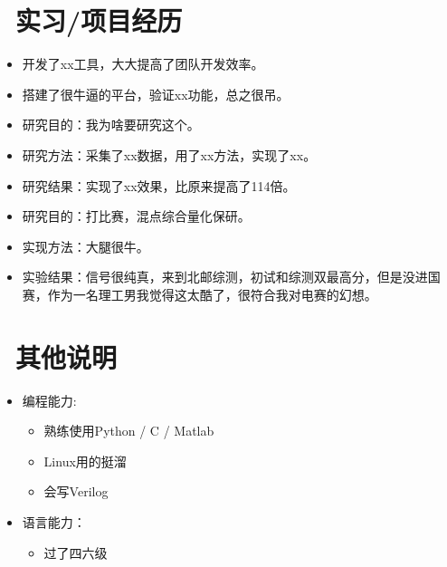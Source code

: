 \documentclass{resume}
\begin{document}
\section{\faUsers\ 实习/项目经历}

\begin{itemize}
  \item 开发了xx工具，大大提高了团队开发效率。
  \item 搭建了很牛逼的平台，验证xx功能，总之很吊。
\end{itemize}

\begin{itemize}
  \item 研究目的：我为啥要研究这个。
  \item 研究方法：采集了xx数据，用了xx方法，实现了xx。
  \item 研究结果：实现了xx效果，比原来提高了114倍。
\end{itemize}

\begin{itemize}
  \item 研究目的：打比赛，混点综合量化保研。
  \item 实现方法：大腿很牛。
  \item 实验结果：信号很纯真，来到北邮综测，初试和综测双最高分，但是没进国赛，作为一名理工男我觉得这太酷了，很符合我对电赛的幻想。
\end{itemize}


\section{\faCogs\ 其他说明}
\begin{itemize}[parsep=0.5ex]
  \item 编程能力: 
  \begin{itemize}
    \item 熟练使用Python / C / Matlab
    \item Linux用的挺溜
    \item 会写Verilog
  \end{itemize}
  \item 语言能力：
  \begin{itemize}
    \item 过了四六级
  \end{itemize}
\end{itemize}
\end{document}
